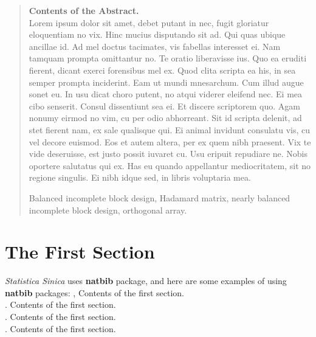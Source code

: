 \documentclass[12pt]{article} %
\renewcommand{\theequation}{\thesection\arabic{equation}}
\theoremstyle{definition}
\begin{document}
\begin{quotation}
{\bf Contents of the Abstract.}\\
Lorem ipsum dolor sit amet, debet putant in nec, fugit gloriatur eloquentiam no vix. Hinc mucius disputando sit ad. Qui quas ubique ancillae id. Ad mel doctus tacimates, vis fabellas interesset ei.
Nam tamquam prompta omittantur no. Te oratio liberavisse ius. Quo ea eruditi fierent, dicant exerci forensibus mel ex. Quod clita scripta ea his, in sea semper prompta inciderint. Eam ut mundi mnesarchum. Cum illud augue sonet eu.
In usu dicat choro putent, no atqui viderer eleifend nec. Ei mea cibo senserit. Consul dissentiunt sea ei. Et discere scriptorem quo. Agam nonumy eirmod no vim, cu per odio abhorreant.
Sit id scripta delenit, ad stet fierent nam, ex sale qualisque qui. Ei animal invidunt consulatu vis, cu vel decore euismod. Eos et autem altera, per ex quem nibh praesent. Vix te vide deseruisse, est justo possit iuvaret cu.
Usu eripuit repudiare ne. Nobis oportere salutatus qui ex. Has eu quando appellantur mediocritatem, sit no regione singulis. Ei nibh idque sed, in libris voluptaria mea.


\vspace{9pt}
Balanced incomplete block design, Hadamard matrix, nearly balanced incomplete block design, orthogonal array.
\par
\end{quotation}\par



\def\thefigure{\arabic{figure}}
\def\thetable{\arabic{table}}

\renewcommand{\theequation}{\thesection.\arabic{equation}}


\fontsize{12}{14pt plus.8pt minus .6pt}\selectfont




\section{ The First Section}

{\it Statistica Sinica} uses {\bf natbib} package, and here are some examples of using {\bf natbib} packages:
\cite{1988},
Contents of the first section.\\
\citet[Chap.~2]{1943}.
Contents of the first section.\\
\cite{Eubank}.
Contents of the first section.\\
\cite{Noakes}.
Contents of the first section.\\
\end{document}
